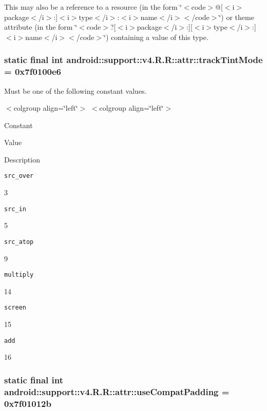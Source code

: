 This may also be a reference to a resource (in the form \char`\"{}$<$code$>$@\mbox{[}$<$i$>$package$<$/i$>$:\mbox{]}$<$i$>$type$<$/i$>$:$<$i$>$name$<$/i$>$$<$/code$>$\char`\"{}) or theme attribute (in the form \char`\"{}$<$code$>$?\mbox{[}$<$i$>$package$<$/i$>$:\mbox{]}\mbox{[}$<$i$>$type$<$/i$>$:\mbox{]}$<$i$>$name$<$/i$>$$<$/code$>$\char`\"{}) containing a value of this type. \hypertarget{classandroid_1_1support_1_1v4_1_1_r_1_1attr_a7f994dd64217d61dbfd111e7bb5c657}{
\subsubsection[{trackTintMode}]{\setlength{\rightskip}{0pt plus 5cm}static final int android::support::v4.R.R::attr::trackTintMode = 0x7f0100e6}}
\label{classandroid_1_1support_1_1v4_1_1_r_1_1attr_a7f994dd64217d61dbfd111e7bb5c657}


Must be one of the following constant values. \begin{TabularC}{0}
\hline
\end{TabularC}
$<$colgroup align=\char`\"{}left\char`\"{}$>$ $<$colgroup align=\char`\"{}left\char`\"{}$>$ 

Constant

Value

Description 

{\tt src\_\-over}

3

{\tt src\_\-in}

5

{\tt src\_\-atop}

9

{\tt multiply}

14

{\tt screen}

15

{\tt add}

16\hypertarget{classandroid_1_1support_1_1v4_1_1_r_1_1attr_53bef6bde9aa190aee3625ff94ed4571}{
\subsubsection[{useCompatPadding}]{\setlength{\rightskip}{0pt plus 5cm}static final int android::support::v4.R.R::attr::useCompatPadding = 0x7f01012b}}
\label{classandroid_1_1support_1_1v4_1_1_r_1_1attr_53bef6bde9aa190aee3625ff94ed4571}


